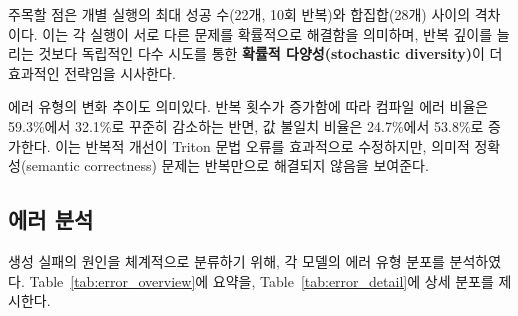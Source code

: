 \documentclass[sigplan,screen,review,anonymous]{acmart}
\begin{document}
주목할 점은 개별 실행의 최대 성공 수(22개, 10회 반복)와 합집합(28개) 사이의 격차이다. 이는 각 실행이 서로 다른 문제를 확률적으로 해결함을 의미하며, 반복 깊이를 늘리는 것보다 독립적인 다수 시도를 통한 \textbf{확률적 다양성(stochastic diversity)}이 더 효과적인 전략임을 시사한다.

에러 유형의 변화 추이도 의미있다. 반복 횟수가 증가함에 따라 컴파일 에러 비율은 59.3\%에서 32.1\%로 꾸준히 감소하는 반면, 값 불일치 비율은 24.7\%에서 53.8\%로 증가한다. 이는 반복적 개선이 Triton 문법 오류를 효과적으로 수정하지만, 의미적 정확성(semantic correctness) 문제는 반복만으로 해결되지 않음을 보여준다.

\subsection{에러 분석}
\label{subsec:error_analysis}

생성 실패의 원인을 체계적으로 분류하기 위해, 각 모델의 에러 유형 분포를 분석하였다. Table~\ref{tab:error_overview}에 요약을, Table~\ref{tab:error_detail}에 상세 분포를 제시한다.

\begin{table}[t]
\centering
\caption{모델별 주요 실패 유형 요약.}
\label{tab:error_overview}
\end{table}
\end{document}
